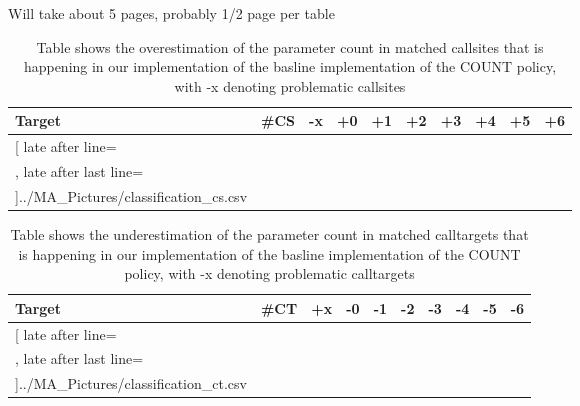 Will take about 5 pages, probably 1/2 page per table

\begin{wraptable}{r}{0pt}
	\begin{tabular}{l|c|c|c|c|c|c|c|c|c}%
	\toprule
	\bfseries Target & \bfseries \#CS & \bfseries -x & \bfseries +0 & \bfseries +1 & \bfseries +2 & \bfseries +3 & \bfseries +4 & \bfseries +5 & \bfseries +6 %
	\\\midrule
	\csvreader[ late after line=\\, late after last line=\\\bottomrule]{../MA_Pictures/classification_cs.csv}{
	}
	{\csvcoli & \csvcoliii & \csvcoliv & \csvcolv & \csvcolvi & \csvcolvii & \csvcolviii & \csvcolix & \csvcolx & \csvcolxi}%
    	\end{tabular}
		\caption {Table shows the overestimation of the parameter count in matched callsites that is happening in our implementation of the basline implementation of the COUNT policy, with -x denoting problematic callsites}
	\label{tbl:baselinecs}
\end{wraptable}

\begin{wraptable}{r}{0pt}
	\begin{tabular}{l|c|c|c|c|c|c|c|c|c}%
	\toprule
	\bfseries Target & \bfseries \#CT & \bfseries +x & \bfseries -0 & \bfseries -1 & \bfseries -2 & \bfseries -3 & \bfseries -4 & \bfseries -5 & \bfseries -6 %
	\\\midrule
	\csvreader[ late after line=\\, late after last line=\\\bottomrule]{../MA_Pictures/classification_ct.csv}{
	}
	{\csvcoli & \csvcoliii & \csvcoliv & \csvcolv & \csvcolvi & \csvcolvii & \csvcolviii & \csvcolix & \csvcolx & \csvcolxi}%
    	\end{tabular}
		\caption {Table shows the underestimation of the parameter count in matched calltargets that is happening in our implementation of the basline implementation of the COUNT policy, with -x denoting problematic calltargets}
	\label{tbl:baselinect}
\end{wraptable}



